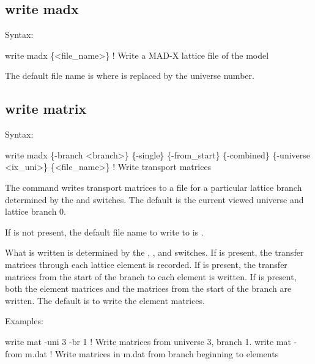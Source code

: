 {{{{{{{{{{{%

\subsection{write madx}
\label{s:write.madx}

Syntax:
\begin{example}
    write madx \{<file_name>\}  ! Write a MAD-X lattice file of the model
\end{example}

The default file name is  where \vn{\#} is replaced by the universe number. 


\subsection{write matrix}
\label{s:write.mat}

Syntax:
\begin{example}
    write madx \{-branch <branch>\} \{-single\} \{-from_start\} \{-combined\}
               \{-universe <ix_uni>\} \{<file_name>\}  ! Write transport matrices
\end{example}

The  command writes transport matrices to a file for a particular lattice branch
determined by the  and  switches. The default is the current viewed
universe and lattice branch 0.

If  is not present, the default file name to write to is .

What is written is determined by the , , and 
switches. If  is present, the transfer matrices through each lattice element is recorded.
If  is present, the transfer matrices from the start of the branch to each element
is written. If  is present, both the element matrices and the matrices from the start
of the branch are written. The default is to write the element matrices.

Examples:
\begin{example}
  write mat -uni 3 -br 1  ! Write matrices from universe 3, branch 1.
  write mat -from m.dat   ! Write matrices in m.dat from branch beginning to elements
\end{example}

}}}}}}}}}}}
